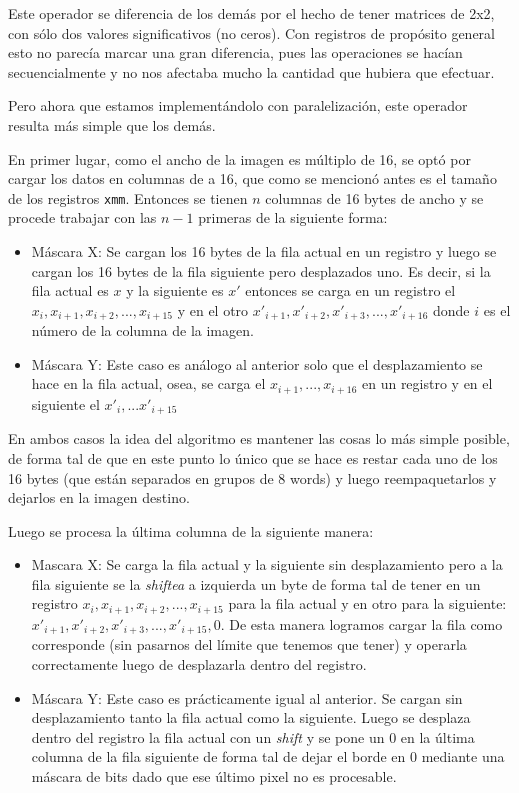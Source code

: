 Este operador se diferencia de los demás por el hecho de tener matrices de 2x2,
con sólo dos valores significativos (no ceros). Con registros de propósito general
esto no parecía marcar una gran diferencia, pues las operaciones se hacían
secuencialmente y no nos afectaba mucho la cantidad que hubiera que efectuar.

Pero ahora que estamos implementándolo con paralelización, este operador resulta
más simple que los demás.

En primer lugar, como el ancho de la imagen es múltiplo de 16, se optó por cargar
los datos en columnas de a 16, que como se mencionó antes es el tamaño de los registros \texttt{xmm}. Entonces se tienen $n$ columnas de 16 bytes de ancho y se procede trabajar con las $n-1$ primeras de la siguiente forma: 

\begin{itemize}
\item Máscara X: Se cargan los 16 bytes de la fila actual en un registro y luego se cargan los 16 bytes de la fila siguiente pero desplazados uno. Es decir, si la fila actual es $x$ y la siguiente es $x'$ entonces se carga en un registro el $x_i, x_{i+1}, x_{i+2}, ... , x_{i+15}$ y en el otro $x'_{i+1}, x'_{i+2}, x'_{i+3}, ... , x'_{i+16}$ donde $i$ es el número de la columna de la imagen. 
\item Máscara Y: Este caso es análogo al anterior solo que el desplazamiento se hace en la fila actual, osea, se carga el $x_{i+1}, ..., x_{i+16}$ en un registro y en el siguiente el $x'_i, ... x'_{i+15}$
\end{itemize}

En ambos casos la idea del algoritmo es mantener las cosas lo más simple posible, de forma tal de que en este punto lo único que se hace es restar cada uno de los 16 bytes (que están separados en grupos de 8 words) y luego reempaquetarlos y dejarlos en la imagen destino. 

Luego se procesa la última columna de la siguiente manera:
\begin{itemize}
\item Mascara X: Se carga la fila actual y la siguiente sin desplazamiento pero a la fila siguiente se la \emph{shiftea} a izquierda un byte de forma tal de tener en un registro $x_i, x_{i+1}, x_{i+2}, ... , x_{i+15}$ para la fila actual y en otro para la siguiente: $x'_{i+1}, x'_{i+2}, x'_{i+3}, ..., x'_{i+15}, 0$. De esta manera logramos cargar la fila como corresponde (sin pasarnos del límite que tenemos que tener) y operarla correctamente luego de desplazarla dentro del registro. 
\item Máscara Y: Este caso es prácticamente igual al anterior. Se cargan sin desplazamiento tanto la fila actual como la siguiente. Luego se desplaza dentro del registro la fila actual con un \emph{shift} y se pone un 0 en la última columna de la fila siguiente de forma tal de dejar el borde en 0 mediante una máscara de bits dado que ese último pixel no es procesable.
\end{itemize}

